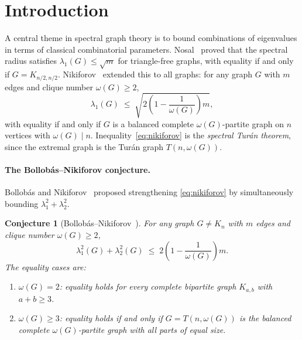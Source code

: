 \documentclass[preprint,12pt]{elsarticle}
\theoremstyle{plain}
\newtheorem{conjecture}[theorem]{Conjecture}
\theoremstyle{definition}
\begin{document}
\section{Introduction}
\label{sec:intro}

A central theme in spectral graph theory is to bound combinations of
eigenvalues in terms of classical combinatorial parameters.
Nosal~\cite{Nosal1970} proved that the spectral radius satisfies
$\lambda_1(G) \leq \sqrt{m}$ for triangle-free graphs, with equality
if and only if $G = K_{n/2,n/2}$.
Nikiforov~\cite{Nikiforov2002} extended this to all graphs: for any
graph $G$ with $m$ edges and clique number $\omega(G) \geq 2$,
\begin{equation}
  \label{eq:nikiforov}
  \lambda_1(G)
  \;\leq\;
  \sqrt{2\!\left(1 - \frac{1}{\omega(G)}\right)m},
\end{equation}
with equality if and only if $G$ is a balanced complete
$\omega(G)$-partite graph on $n$ vertices with $\omega(G) \mid n$.
Inequality~\eqref{eq:nikiforov} is the \emph{spectral Tur\'an theorem},
since the extremal graph is the Tur\'an graph $T(n,\omega(G))$.

\paragraph{The Bollob\'as--Nikiforov conjecture.}
Bollob\'as and Nikiforov~\cite{BollobasNikiforov2007} proposed
strengthening \eqref{eq:nikiforov} by simultaneously bounding
$\lambda_1^2 + \lambda_2^2$.

\begin{conjecture}[Bollob\'{a}s--Nikiforov~\cite{BollobasNikiforov2007}]
  \label{conj:BN}
  For any graph $G \neq K_n$ with $m$ edges and clique number
  $\omega(G) \geq 2$,
  \[
    \lambda_1^2(G) + \lambda_2^2(G)
    \;\leq\;
    2\!\left(1 - \frac{1}{\omega(G)}\right)m.
  \]
  The equality cases are:
  \begin{enumerate}[label=(\alph*)]
    \item $\omega(G) = 2$: equality holds for every complete bipartite
          graph $K_{a,b}$ with $a + b \geq 3$.
    \item $\omega(G) \geq 3$: equality holds if and only if $G = T(n,\omega(G))$
          is the balanced complete $\omega(G)$-partite graph with all parts of
          equal size.
  \end{enumerate}
\end{conjecture}
\end{document}
